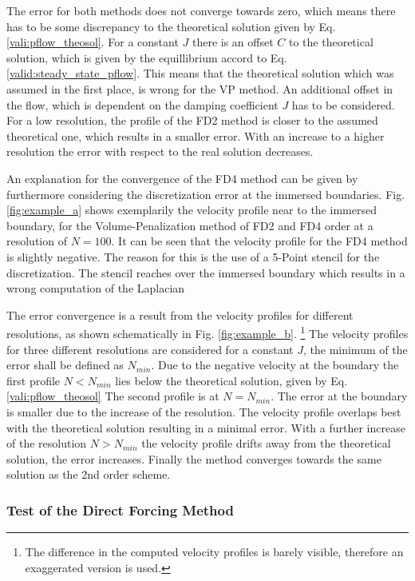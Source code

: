 The error for both methods does not converge towards zero, which means there has to be some discrepancy to the theoretical solution given by
Eq. \ref{vali:pflow_theosol}.
For a constant $J$ there is an offset $C$ to the theoretical solution,
which is given by the equillibrium accord to Eq.  \ref{valid:steady_state_pflow}.
This means that the theoretical solution which was assumed in the first place, is wrong for the VP method.
An additional offset in the flow, which is dependent on the damping coefficient $J$ has to be considered.
For a low resolution, the profile of the FD2  method is closer to the assumed theoretical one, which results in a smaller
error. With an increase to a higher resolution the error with respect to the real solution decreases.

An explanation for the convergence of the FD4 method can be given by furthermore considering the discretization error at the immersed boundaries.
Fig. \ref{fig:example_a} shows exemplarily the velocity profile near to the immersed boundary, for the Volume-Penalization method of FD2 and FD4 order
at a resolution of $N=100$.
It can be seen that the velocity profile for the FD4  method  is slightly negative.
The reason for this is the use of a 5-Point stencil for the discretization.
The stencil reaches over the immersed boundary which results in a wrong computation of the Laplacian

The  error convergence is a result from  the velocity profiles for different resolutions,
as shown schematically in Fig. \ref{fig:example_b}.
\footnote{The difference in the computed velocity profiles is barely visible, therefore an exaggerated version is used.}
The velocity profiles for three different resolutions are considered for a constant $J$,
the minimum of the error shall be defined as $N_{min}$.
Due to the negative velocity at the boundary the first profile $N<N_{min}$ lies below the theoretical solution,
given by Eq. \ref{vali:pflow_theosol}
The second profile is at $N=N_{min}$. The error at the boundary is smaller due to the increase of the resolution.
The velocity profile overlaps best with the theoretical solution resulting in a minimal error.
With a further increase of the resolution  $N>N_{min}$ the velocity profile drifts away from the theoretical solution,
the error increases.  Finally the method converges towards the same solution as the 2nd order scheme.


\subsubsection{Test of the Direct Forcing Method}

